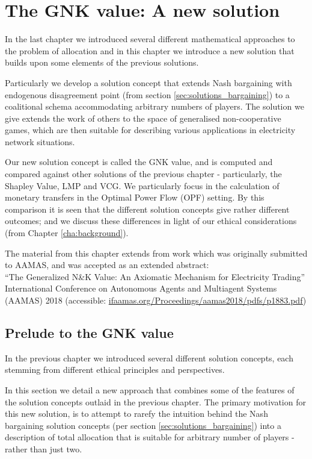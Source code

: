 \chapter{The GNK value: A new solution}
\label{cha:new_solution}

In the last chapter we introduced several different mathematical approaches to the problem of allocation and in this chapter we introduce a new solution that builds upon some elements of the previous solutions.

Particularly we develop a solution concept that extends Nash bargaining with endogenous disagreement point (from section \ref{sec:solutions_bargaining}) to a coalitional schema accommodating arbitrary numbers of players.
The solution we give extends the work of others to the space of generalised non-cooperative games, which are then suitable for describing various applications in electricity network situations.

Our new solution concept is called the GNK value, and is computed and compared against other solutions of the previous chapter - particularly, the Shapley Value, LMP and VCG.
We particularly focus in the calculation of monetary transfers in the Optimal Power Flow (OPF) setting.
By this comparison it is seen that the different solution concepts give rather different outcomes; and we discuss these differences in light of our ethical considerations (from Chapter \ref{cha:background}).

The material from this chapter extends from work which was originally submitted to AAMAS, and was accepted as an extended abstract: \\
\-\hspace{5mm}``The Generalized N\&K Value: An Axiomatic Mechanism for Electricity Trading''\\ International Conference on Autonomous Agents and Multiagent Systems\\ (AAMAS) 2018 (accessible: \href{ifaamas.org/Proceedings/aamas2018/pdfs/p1883.pdf}{ifaamas.org/Proceedings/aamas2018/pdfs/p1883.pdf})


\section{Prelude to the GNK value}

In the previous chapter we introduced several different solution concepts, each stemming from different ethical principles and perspectives.

In this section we detail a new approach that combines some of the features of the solution concepts outlaid in the previous chapter.
The primary motivation for this new solution, is to attempt to rarefy the intuition behind the Nash bargaining solution concepts (per section \ref{sec:solutions_bargaining}) into a description of total allocation that is suitable for arbitrary number of players - rather than just two.



